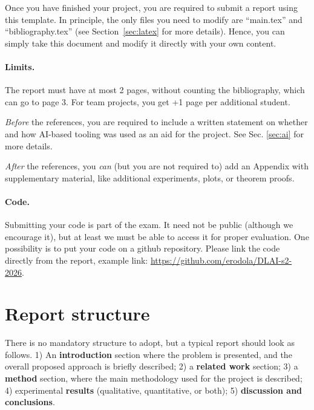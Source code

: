\documentclass{article}
\begin{document}
Once you have finished your project, you are required to submit a report using this template. In principle, the only files you need to modify are ``main.tex'' and ``bibliography.tex'' (see Section~\ref{sec:latex} for more details). Hence, you can simply take this document and modify it directly with your own content.

\paragraph*{Limits.}
The report must have at most 2 pages, without counting the bibliography, which can go to page 3. For team projects, you get +1 page per additional student. 

\emph{Before} the references, you are required to include a written statement on whether and how AI-based tooling was used as an aid for the project. See Sec. \ref{sec:ai} for more details.

\emph{After} the references, you \emph{can} (but you are not required to) add an Appendix with supplementary material, like additional experiments, plots, or theorem proofs.

\paragraph*{Code.} 
Submitting your code is part of the exam. It need not be public (although we encourage it), but at least we must be able to access it for proper evaluation. One possibility is to put your code on a github repository. Please link the code directly from the report, example link: \url{https://github.com/erodola/DLAI-s2-2026}.

\section{Report structure}

There is no mandatory structure to adopt, but a typical report should look as follows. 1) An \textbf{introduction} section where the problem is presented, and the overall proposed approach is briefly described; 2) a \textbf{related work} section; 3) a \textbf{method} section, where the main methodology used for the project is described; 4) experimental \textbf{results} (qualitative, quantitative, or both); 5) \textbf{discussion and conclusions}.

\end{document}

